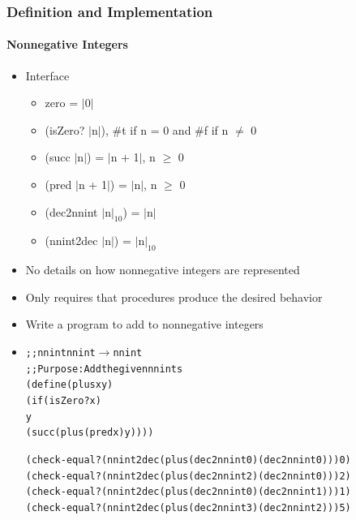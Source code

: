 \documentclass{beamer}
\newcommand{\arrow}{\(\rightarrow\)}
\begin{document}
\begin{frame}[fragile]
\frametitle{Definition and Implementation}
\framesubtitle{Nonnegative Integers}
\begin{scriptsize}
\begin{itemize}
\item<1-> Interface
\begin{itemize}
  \item zero = $|$0$|$
  \item (isZero? $|$n$|$), \#t if n = 0 and \#f if n $\neq$ 0
  \item (succ $|$n$|$) = $|$n + 1$|$, n $\geq$ 0
  \item (pred $|$n + 1$|$) = $|$n$|$, n $\geq$ 0
  \item (dec2nnint $|$n$|_{10}$) = $|$n$|$
  \item (nnint2dec $|$n$|$) = $|$n$|_{10}$
\end{itemize}

\item<1-> No details on how nonnegative integers are represented

\item<1-> Only requires that procedures produce the desired behavior

\item<2-> Write a program to add to nonnegative integers

\item<3->
\begin{alltt}
;; nnint nnint \arrow{} nnint
;; Purpose: Add the given nnints
(define (plus x y)
  (if (isZero? x)
      y
      (succ (plus (pred x) y))))

(check-equal? (nnint2dec (plus (dec2nnint 0) (dec2nnint 0))) 0)
(check-equal? (nnint2dec (plus (dec2nnint 2) (dec2nnint 0))) 2)
(check-equal? (nnint2dec (plus (dec2nnint 0) (dec2nnint 1))) 1)
(check-equal? (nnint2dec (plus (dec2nnint 3) (dec2nnint 2))) 5)
\end{alltt}

\end{itemize}
\end{scriptsize}
\end{frame}
\end{document}

